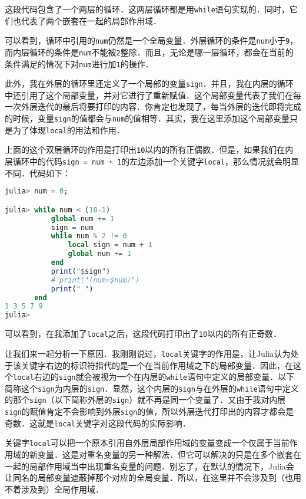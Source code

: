 这段代码包含了一个两层的循环．这两层循环都是用\verb|while|语句实现的．同时，它们也代表了两个嵌套在一起的局部作用域．

可以看到，循环中引用的\verb|num|仍然是一个全局变量．外层循环的条件是\verb|num|小于\verb|9|，而内层循环的条件是\verb|num|不能被\verb|2|整除．而且，无论是哪一层循环，都会在当前的条件满足的情况下对\verb|num|进行加\verb|1|的操作．

此外，我在外层的循环里还定义了一个局部的变量\verb|sign|．并且，我在内层的循环中还引用了这个局部变量，并对它进行了重新赋值．这个局部变量代表了我们在每一次外层迭代的最后将要打印的内容．你肯定也发现了，每当外层的迭代即将完成的时候，变量\verb|sign|的值都会与\verb|num|的值相等．其实，我在这里添加这个局部变量只是为了体现\verb|local|的用法和作用．

上面的这个双层循环的作用是打印出\verb|10|以内的所有正偶数．但是，如果我们在内层循环中的代码\verb|sign = num + 1|的左边添加一个关键字\verb|local|，那么情况就会明显不同．代码如下：

\begin{lstlisting}[language=julia]
julia> num = 0;

julia> while num < (10-1) 
           global num += 1
           sign = num
           while num % 2 != 0
               local sign = num + 1
               global num += 1
           end
           print("$sign")
           # print("(num=$num)")
           print(" ")
       end
1 3 5 7 9 
julia> 
\end{lstlisting}

可以看到，在我添加了\verb|local|之后，这段代码打印出了\verb|10|以内的所有正奇数．

让我们来一起分析一下原因．我刚刚说过，\verb|local|关键字的作用是，让Julia认为处于该关键字右边的标识符指代的是一个在当前作用域之下的局部变量．因此，在这个\verb|local|右边的\verb|sign|就会被视为一个在内层的\verb|while|语句中定义的局部变量．以下简称这个\verb|sign|为内层的\verb|sign|．显然，这个内层的\verb|sign|与在外层的\verb|while|语句中定义的那个\verb|sign|（以下简称外层的\verb|sign|）就不再是同一个变量了．又由于我对内层\verb|sign|的赋值肯定不会影响到外层\verb|sign|的值，所以外层迭代打印出的内容才都会是奇数．这就是\verb|local|关键字对这段代码的实际影响．

关键字\verb|local|可以把一个原本引用自外层局部作用域的变量变成一个仅属于当前作用域的新变量．这是对重名变量的另一种解法．但它可以解决的只是在多个嵌套在一起的局部作用域当中出现重名变量的问题．别忘了，在默认的情况下，Julia会让同名的局部变量遮蔽掉那个对应的全局变量．所以，在这里并不会涉及到（也用不着涉及到）全局作用域．

